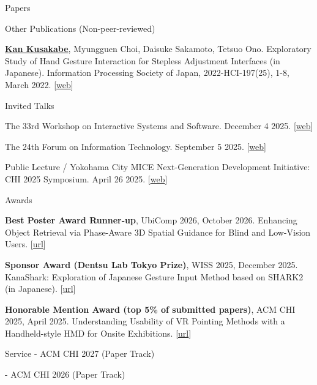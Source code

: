 \documentclass[
	11pt, %
]{resume} %
\begin{document}
\begin{rSection}{Papers}
\begin{rSubsection}{Other Publications (Non-peer-reviewed)}{}{}{}
		\item \underline{\textbf{Kan Kusakabe}}, Myungguen Choi, Daisuke Sakamoto, Tetsuo Ono. Exploratory Study of Hand Gesture Interaction for Stepless Adjustment Interfaces (in Japanese). Information Processing Society of Japan, 2022-HCI-197(25), 1-8, March 2022. [\href{https://ipsj.ixsq.nii.ac.jp/records/217445}{web}]
	\end{rSubsection}

    \begin{rSubsection}{Invited Talks}{}{}{}
        \item The 33rd Workshop on Interactive Systems and Software. December 4 2025. [\href{https://www.wiss.org/WISS2025/demo.html}{web}]
        
        \item The 24th Forum on Information Technology. September 5 2025. [\href{https://www.ipsj.or.jp/event/fit/fit2025/index.html}{web}]
    
		\item Public Lecture / Yokohama City MICE Next-Generation Development Initiative: CHI 2025 Symposium. April 26 2025. [\href{https://sigchi.jp/symposium/chi2025_symposium/}{web}]
        
	\end{rSubsection}

\end{rSection}

\begin{rSection}{Awards}
	\item \textbf{Best Poster Award Runner-up}, UbiComp 2026, October 2026. Enhancing Object Retrieval via Phase-Aware 3D Spatial Guidance for Blind and Low-Vision Users. [\href{https://www.ubicomp.org/ubicomp-iswc-2026/awards-all/}{url}]
	\item \textbf{Sponsor Award (Dentsu Lab Tokyo Prize)}, WISS 2025, December 2025. KanaShark: Exploration of Japanese Gesture Input Method based on SHARK2 (in Japanese). [\href{https://www.wiss.org/WISS2025/award.html}{url}]
	\item \textbf{Honorable Mention Award (top 5\% of submitted papers)}, ACM CHI 2025, April 2025. Understanding Usability of VR Pointing Methods with a Handheld-style HMD for Onsite Exhibitions. [\href{https://programs.sigchi.org/chi/2025/awards/honorable-mentions}{url}]
\end{rSection}
\begin{rSection}{Service}{}{}{}
    - ACM CHI 2027 (Paper Track)

    - ACM CHI 2026 (Paper Track)
\end{rSection}
\end{document}
